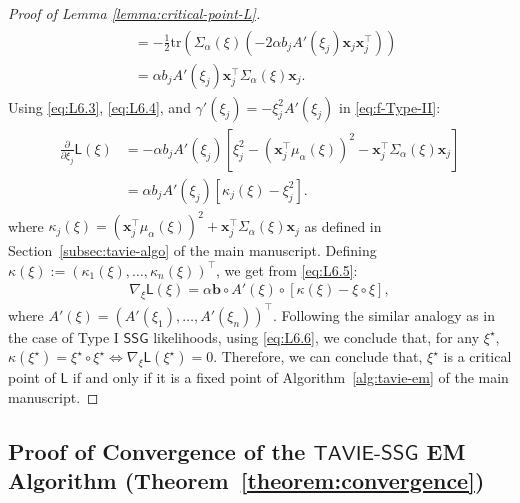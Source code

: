 \documentclass[12pt]{article}
\numberwithin{equation}{section}
\newcommand{\tssg}{\mathsf{TAVIE}\text{-}\mathsf{SSG}}
\begin{document}
\begin{proof}[Proof of Lemma \ref{lemma:critical-point-L}]
\begin{align}
\begin{split}
        &= -\frac{1}{2}\mathrm{tr}\left(\Sigma_{\alpha}(\xi)\left(-2\alpha b_j A'(\xi_j)\mathbf{x}_j\mathbf{x}_j^{\top}\right)\right)\\
        &= \alpha b_j A'(\xi_j)\mathbf{x}_j^{\top}\Sigma_{\alpha}(\xi)\mathbf{x}_j.
    \end{split}
\end{align}
Using \eqref{eq:L6.3}, \eqref{eq:L6.4}, and $\gamma'(\xi_j) = -\xi_j^2A'(\xi_j)$ in \eqref{eq:f-Type-II}:
\begin{align}\label{eq:L6.5}
    \begin{split}
        \frac{\partial}{\partial \xi_j}\mathsf{L}(\xi) &= -\alpha b_j A'(\xi_j)\left[\xi_j^2 - \left(\mathbf{x}_j^{\top}\mu_{\alpha}(\xi)\right)^2 - \mathbf{x}_j^{\top}\Sigma_{\alpha}(\xi)\mathbf{x}_j\right]\\
        &= \alpha b_j A'(\xi_j)\left[\kappa_j(\xi) - \xi_j^2\right].
    \end{split}
\end{align}
where $\kappa_j(\xi) = \left(\mathbf{x}_j^{\top}\mu_{\alpha}(\xi)\right)^2 + \mathbf{x}_j^{\top}\Sigma_{\alpha}(\xi)\mathbf{x}_j$ as defined in Section~\ref{subsec:tavie-algo} of the main manuscript. Defining $\kappa(\xi) := (\kappa_1(\xi),\ldots,\kappa_n(\xi))^{\top}$, we get from \eqref{eq:L6.5}:
\begin{align}\label{eq:L6.6}
    \nabla_{\xi} \mathsf{L}(\xi) = \alpha \mathbf{b}\circ A'(\xi)\circ \left[\kappa(\xi) - \xi \circ \xi\right],
\end{align}
where $A'(\xi) = (A'(\xi_1), \ldots, A'(\xi_n))^{\top}$.
Following the similar analogy as in the case of Type I $\mathsf{SSG}$ likelihoods, using \eqref{eq:L6.6}, we conclude that, for any $\xi^{\star}$,  $\kappa(\xi^{\star}) = \xi^{\star} \circ \xi^{\star} \iff \nabla_{\xi}\mathsf{L}(\xi^{\star}) = 0$. Therefore, we can conclude that, $\xi^{\star}$ is a critical point of $\mathsf{L}$ if and only if it is a fixed point of Algorithm~\ref{alg:tavie-em} of the main manuscript.
\end{proof}


\subsection{Proof of Convergence of the \texorpdfstring{$\tssg$}{TAVIE-SSG} EM Algorithm \texorpdfstring{(Theorem~\ref{theorem:convergence})}{(Theorem 1)}}\label{app:TAVIE-convergence}
\end{document}
